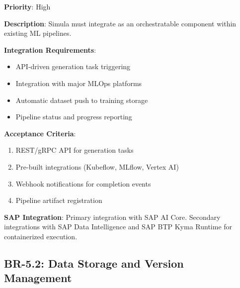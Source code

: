 \begin{tcolorbox}[colback=purple!5,colframe=purple!70,title=BR-5.1: MLOps Pipeline Integration]
\textbf{Priority}: High

\textbf{Description}: Simula must integrate as an orchestratable component within
existing ML pipelines.

\textbf{Integration Requirements}:
\begin{itemize}
  \item API-driven generation task triggering
  \item Integration with major MLOps platforms
  \item Automatic dataset push to training storage
  \item Pipeline status and progress reporting
\end{itemize}

\textbf{Acceptance Criteria}:
\begin{enumerate}
  \item REST/gRPC API for generation tasks
  \item Pre-built integrations (Kubeflow, MLflow, Vertex AI)
  \item Webhook notifications for completion events
  \item Pipeline artifact registration
\end{enumerate}

\textbf{SAP Integration}: Primary integration with SAP AI Core. Secondary
integrations with SAP Data Intelligence and SAP BTP Kyma Runtime for
containerized execution.
\end{tcolorbox}

\subsection{BR-5.2: Data Storage and Version Management}

